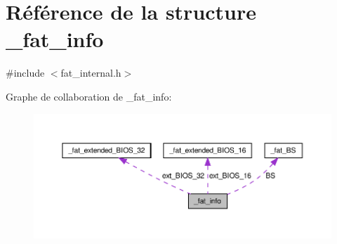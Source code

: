 \hypertarget{struct__fat__info}{\section{Référence de la structure \+\_\+fat\+\_\+info}
\label{struct__fat__info}
}


{\ttfamily \#include $<$fat\+\_\+internal.\+h$>$}



Graphe de collaboration de \+\_\+fat\+\_\+info\+:\nopagebreak
\begin{figure}[H]
\begin{center}
\leavevmode
\includegraphics[width=350pt]{struct__fat__info__coll__graph}
\end{center}
\end{figure}
